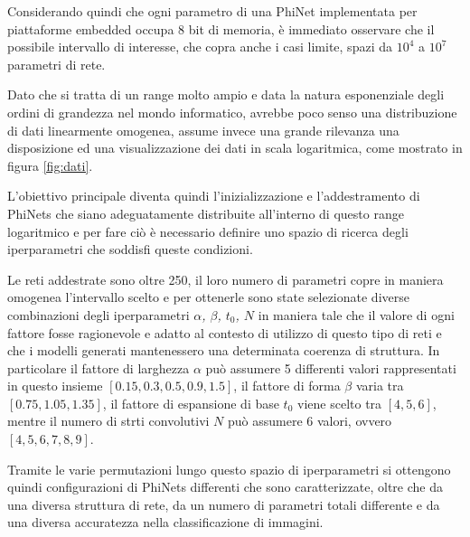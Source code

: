 Considerando quindi che ogni parametro di una PhiNet implementata per piattaforme embedded occupa 8 bit di memoria, è immediato osservare che il possibile intervallo di interesse, che copra anche i casi limite, spazi da $10^{4}$ a $10^{7}$ parametri di rete.

Dato che si tratta di un range molto ampio e data la natura esponenziale degli ordini di grandezza nel mondo informatico, avrebbe poco senso una distribuzione di dati linearmente omogenea, assume invece una grande rilevanza una disposizione ed una visualizzazione dei dati in scala logaritmica, come mostrato in figura \ref{fig:dati}.

L'obiettivo principale diventa quindi l'inizializzazione e l'addestramento di PhiNets che siano adeguatamente distribuite all'interno di questo range logaritmico e per fare ciò è necessario definire uno spazio di ricerca degli iperparametri che soddisfi queste condizioni. 

Le reti addestrate sono oltre 250, il loro numero di parametri copre in maniera omogenea l'intervallo scelto e per ottenerle sono state selezionate diverse combinazioni degli iperparametri \textit{$\alpha$, $\beta$, $t_{0}$, $N$} in maniera tale che il valore di ogni fattore fosse ragionevole e adatto al contesto di utilizzo di questo tipo di reti e che i modelli generati mantenessero una determinata coerenza di struttura.
In particolare il fattore di larghezza $\alpha$ può assumere 5 differenti valori rappresentati in questo insieme $[0.15, 0.3, 0.5, 0.9, 1.5]$, il fattore di forma $\beta$ varia tra $[0.75, 1.05, 1.35]$, il fattore di espansione di base $t_{0}$ viene scelto tra $[4, 5, 6]$, mentre il numero di strti convolutivi $N$ può assumere 6 valori, ovvero $[4, 5, 6, 7, 8, 9]$.

\iffalse
\begin{center}
    \begin{tabular}{|c|c|}
        \hline
        Fattore di scala & \multicolumn{1}{c|}{Valori} \\
        \hline
        $\alpha$ & $0.15, 0.3, 0.5, 0.9, 1.5$ \\
        $\beta$ & $0.75, 1.05, 1.35$ \\
        $t_{0}$ & $4, 5, 6$ \\
        $N$ & $4, 5, 6, 7, 8, 9$ \\
        \hline
    \end{tabular}
\end{center}
\fi

Tramite le varie permutazioni lungo questo spazio di iperparametri si ottengono quindi configurazioni di PhiNets differenti che sono caratterizzate, oltre che da una diversa struttura di rete, da un numero di parametri totali differente e da una diversa accuratezza nella classificazione di immagini.

